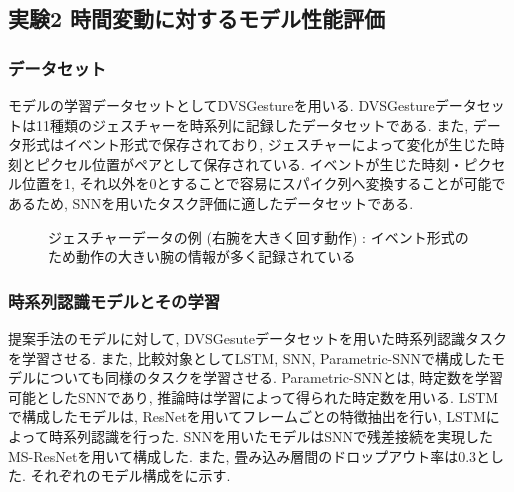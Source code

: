 \makeatletter %
\subsection{実験2 時間変動に対するモデル性能評価}

\subsubsection{データセット}
モデルの学習データセットとしてDVSGesture\cite{dvsgesture}を用いる.
DVSGestureデータセットは11種類のジェスチャーを時系列に記録したデータセットである.
また, データ形式はイベント形式で保存されており, ジェスチャーによって変化が生じた時刻とピクセル位置がペアとして保存されている.
イベントが生じた時刻・ピクセル位置を1, それ以外を0とすることで容易にスパイク列へ変換することが可能であるため, SNNを用いたタスク評価に適したデータセットである\cite{9207109}.

\begin{figure*}[t]
    \centering
    \parbox{.9\linewidth}{
        \centering
        
        \caption{ジェスチャーデータの例 (右腕を大きく回す動作) : イベント形式のため動作の大きい腕の情報が多く記録されている}
        \label{sec3:fig:gesture}
    }

\end{figure*}

\subsubsection{時系列認識モデルとその学習}
提案手法のモデルに対して, DVSGesuteデータセットを用いた時系列認識タスクを学習させる.
また, 比較対象としてLSTM, SNN, Parametric-SNN\cite{ParametricSNN}で構成したモデルについても同様のタスクを学習させる.
Parametric-SNNとは, 時定数を学習可能としたSNNであり, 推論時は学習によって得られた時定数を用いる.
LSTMで構成したモデルは, ResNet\cite{ResNet}を用いてフレームごとの特徴抽出を行い, LSTMによって時系列認識を行った\cite{CNNLSTM}.
SNNを用いたモデルはSNNで残差接続を実現したMS-ResNet\cite{MSResNet}を用いて構成した.
また, 畳み込み層間のドロップアウト率は0.3とした.
それぞれのモデル構成をに示す.

